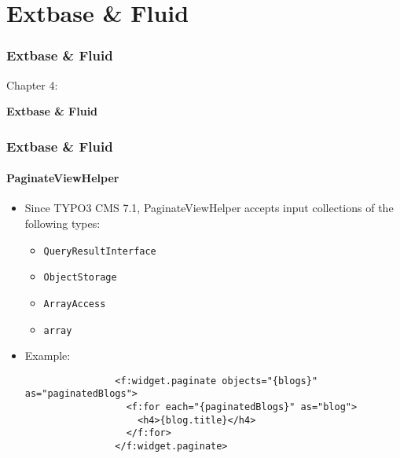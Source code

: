 %

\section{Extbase \& Fluid}
\begin{frame}[fragile]
	\frametitle{Extbase \& Fluid}

	\begin{center}\huge{Chapter 4:}\end{center}
	\begin{center}\huge{\color{typo3darkgrey}\textbf{Extbase \& Fluid}}\end{center}

\end{frame}


\begin{frame}[fragile]
	\frametitle{Extbase \& Fluid}
	\framesubtitle{PaginateViewHelper}

	\begin{itemize}

		\item Since TYPO3 CMS 7.1, PaginateViewHelper accepts input collections of the following types:

			\begin{itemize}
				\item \texttt{QueryResultInterface}
				\item \texttt{ObjectStorage}
				\item \texttt{ArrayAccess}
				\item \texttt{array}
			\end{itemize}

		\item Example:

			\begin{lstlisting}
				<f:widget.paginate objects="{blogs}" as="paginatedBlogs">
				  <f:for each="{paginatedBlogs}" as="blog">
				    <h4>{blog.title}</h4>
				  </f:for>
				</f:widget.paginate>
			\end{lstlisting}

	\end{itemize}

\end{frame}

